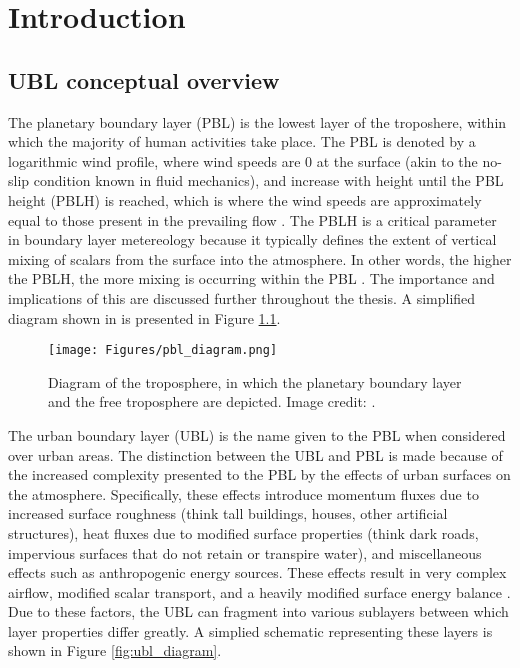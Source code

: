 \chapter{Introduction}
\label{chapter:Introduction}
\thispagestyle{myheadings}

\graphicspath{{1_Intro/}}

\section{UBL conceptual overview}
\label{sec:ubl_overview}

The planetary boundary layer (PBL) is the lowest layer of the troposhere, within which the majority of human activities take place. The PBL is denoted by a logarithmic wind profile, where wind speeds are 0 at the surface (akin to the no-slip condition known in fluid mechanics), and increase with height until the PBL height (PBLH) is reached, which is where the wind speeds are approximately equal to those present in the prevailing flow \citep{garratt1994atmospheric}. The PBLH is a critical parameter in boundary layer metereology because it typically defines the extent of vertical mixing of scalars from the surface into the atmosphere. In other words, the higher the PBLH, the more mixing is occurring within the PBL \citep{garratt1994atmospheric, Stull_1988}. The importance and implications of this are discussed further throughout the thesis. A simplified diagram shown in \citep{Stull_1988} is presented in Figure \ref{fig:pbl_diagram}.

\begin{figure}[ht]
	\centering
	\texttt{[image: Figures/pbl\_diagram.png]}
	\caption{Diagram of the troposphere, in which the planetary boundary layer and the free troposphere are depicted. Image credit: \citet{Stull_1988}.}
	\label{fig:pbl_diagram}
\end{figure}

The urban boundary layer (UBL) is the name given to the PBL when considered over urban areas. The distinction between the UBL and PBL is made because of the increased complexity presented to the PBL by the effects of urban surfaces on the atmosphere. Specifically, these effects introduce momentum fluxes due to increased surface roughness (think tall buildings, houses, other artificial structures), heat fluxes due to modified surface properties (think dark roads, impervious surfaces that do not retain or transpire water), and miscellaneous effects such as anthropogenic energy sources. These effects result in very complex airflow, modified scalar transport, and a heavily modified surface energy balance \citep{barlow2014}. Due to these factors, the UBL can fragment into various sublayers between which layer properties differ greatly. A simplied schematic representing these layers is shown in Figure \ref{fig:ubl_diagram}.

